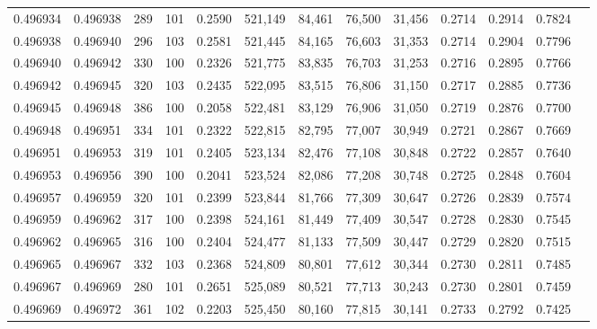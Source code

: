 \begin{tabular}{rrrrrrrrrrrrr}
0.496934 & 0.496938 &   289 & 101 &                                     0.2590 & 521,149 &  84,461 &  76,500 &  31,456 & 0.2714 & 0.2914 & 0.7824 \\
0.496938 & 0.496940 &   296 & 103 &                                     0.2581 & 521,445 &  84,165 &  76,603 &  31,353 & 0.2714 & 0.2904 & 0.7796 \\
0.496940 & 0.496942 &   330 & 100 &                                     0.2326 & 521,775 &  83,835 &  76,703 &  31,253 & 0.2716 & 0.2895 & 0.7766 \\
0.496942 & 0.496945 &   320 & 103 &                                     0.2435 & 522,095 &  83,515 &  76,806 &  31,150 & 0.2717 & 0.2885 & 0.7736 \\
0.496945 & 0.496948 &   386 & 100 &                                     0.2058 & 522,481 &  83,129 &  76,906 &  31,050 & 0.2719 & 0.2876 & 0.7700 \\
0.496948 & 0.496951 &   334 & 101 &                                     0.2322 & 522,815 &  82,795 &  77,007 &  30,949 & 0.2721 & 0.2867 & 0.7669 \\
0.496951 & 0.496953 &   319 & 101 &                                     0.2405 & 523,134 &  82,476 &  77,108 &  30,848 & 0.2722 & 0.2857 & 0.7640 \\
0.496953 & 0.496956 &   390 & 100 &                                     0.2041 & 523,524 &  82,086 &  77,208 &  30,748 & 0.2725 & 0.2848 & 0.7604 \\
0.496957 & 0.496959 &   320 & 101 &                                     0.2399 & 523,844 &  81,766 &  77,309 &  30,647 & 0.2726 & 0.2839 & 0.7574 \\
0.496959 & 0.496962 &   317 & 100 &                                     0.2398 & 524,161 &  81,449 &  77,409 &  30,547 & 0.2728 & 0.2830 & 0.7545 \\
0.496962 & 0.496965 &   316 & 100 &                                     0.2404 & 524,477 &  81,133 &  77,509 &  30,447 & 0.2729 & 0.2820 & 0.7515 \\
0.496965 & 0.496967 &   332 & 103 &                                     0.2368 & 524,809 &  80,801 &  77,612 &  30,344 & 0.2730 & 0.2811 & 0.7485 \\
0.496967 & 0.496969 &   280 & 101 &                                     0.2651 & 525,089 &  80,521 &  77,713 &  30,243 & 0.2730 & 0.2801 & 0.7459 \\
0.496969 & 0.496972 &   361 & 102 &                                     0.2203 & 525,450 &  80,160 &  77,815 &  30,141 & 0.2733 & 0.2792 & 0.7425 \\

\end{tabular}

